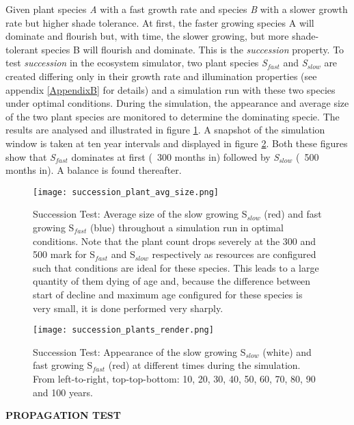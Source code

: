 Given plant species \textit{A} with a fast growth rate and species \textit{B} with a slower growth rate but higher shade tolerance. At first, the faster growing species A will dominate and flourish but, with time, the slower growing, but more shade-tolerant species B will flourish and dominate. This is the \textit{succession} property. To test \textit{succession} in the ecosystem simulator, two plant species \textit{S$_{fast}$} and \textit{S$_{slow}$} are created differing only in their growth rate and illumination properties (see appendix \ref{AppendixB} for details) and a simulation run with these two species under optimal conditions. During the simulation, the appearance and average size of the two plant species are monitored to determine the dominating specie. The results are analysed and illustrated in figure \ref{fig:succession_plants_avg_size}. A snapshot of the simulation window is taken at ten year intervals and displayed in figure \ref{fig:succession_plants_render}. Both these figures show that \textit{S$_{fast}$} dominates at first (~300 months in) followed by \textit{S$_{slow}$} (~500 months in). A balance is found thereafter.\\

\begin{figure}
\center
	\texttt{[image: succession\_plant\_avg\_size.png]}
	\caption{ Succession Test: Average size of the slow growing S$_{slow}$ (red) and fast growing S$_{fast}$ (blue) throughout a simulation run in optimal conditions. Note that the plant count drops severely at the 300 and 500 mark for S$_{fast}$ and S$_{slow}$ respectively as resources are configured such that conditions are ideal for these species. This leads to a large quantity of them dying of age and, because the difference between start of decline and maximum age configured for these species is very small, it is done performed very sharply.}
	\label{fig:succession_plants_avg_size}
\end{figure}

\begin{figure}
\center
	\texttt{[image: succession\_plants\_render.png]}
	\caption{ Succession Test: Appearance of the slow growing S$_{slow}$ (white) and fast growing S$_{fast}$ (red) at different times during the simulation. From left-to-right, top-top-bottom: 10, 20, 30, 40, 50, 60, 70, 80, 90 and 100 years.}
	\label{fig:succession_plants_render}
\end{figure}

\textbf{PROPAGATION TEST}\\

